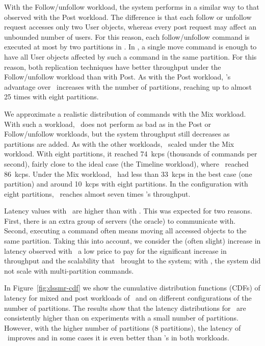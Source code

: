 With the Follow/unfollow workload, the system performs in a similar way to that
observed with the Post workload. The difference is that each follow or unfollow
request accesses only two User objects, whereas every post request may affect an
unbounded number of users. For this reason, each follow/unfollow command is
executed at most by two partitions in \ssmr{}. In \dssmr{}, a single move
command is enough to have all User objects affected by such a command in the
same partition. For this reason, both replication techniques have better
throughput under the Follow/unfollow workload than with Post. As with the Post
workload, \dssmr{}'s advantage over \ssmr\ increases with the number of
partitions, reaching up to almost 25 times with eight partitions.

We approximate a realistic distribution of commands with the Mix workload. With
such a workload, \ssmr\ does not perform as bad as in the Post or
Follow/unfollow workloads, but the system throughput still decreases as
partitions are added. As with the other workloads, \dssmr\ scaled under the Mix
workload. With eight partitions, it reached 74~kcps (thousands of commands per
second), fairly close to the ideal case (the Timeline workload), where \dssmr\
reached 86~kcps. Under the Mix workload, \ssmr\ had less than 33~kcps in the
best case (one partition) and around 10~kcps with eight partitions. In the
configuration with eight partitions, \dssmr\ reaches almost seven times \ssmr's
throughput.

Latency values with \dssmr\ are higher than with \ssmr{}. This was expected for
two reasons. First, there is an extra group of servers (the oracle) to
communicate with. Second, executing a command often means moving all accessed
objects to the same partition. Taking this into account, we consider the (often
slight) increase in latency observed with \dssmr\ a low price to pay for the
significant increase in throughput and the scalability that \dssmr\ brought to
the system; with \ssmr{}, the system did not scale with multi-partition
commands.


In Figure~\ref{fig:dssmr-cdf} we show the cumulative distribution functions
(CDFs) of latency for mixed and post workloads of \dssmr\ and \ssmr on different
configurations of the number of partitions. The results show that the latency
distributions for \dssmr\ are consistently higher than \ssmr on experiments with a small
number of partitions. However, with the higher number of partitions (8
partitions), the latency of \dssmr\ improves and in some cases it is even better than \ssmr's in 
both workloads. 

